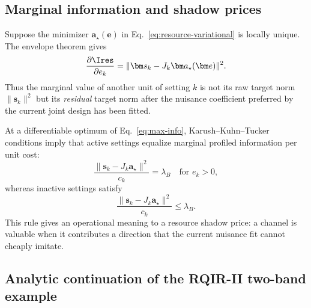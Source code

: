 \subsection{Marginal information and shadow prices}

Suppose the minimizer $\bm a_\star(\bm e)$ in Eq.~\eqref{eq:resource-variational} is locally unique. The envelope theorem gives
\begin{equation}
 \frac{\partial\Ires}{\partial e_k}
 =
 \|\bm s_k-J_k\bm a_\star(\bm e)\|^2.
\label{eq:marginal}
\end{equation}
Thus the marginal value of another unit of setting $k$ is not its raw target norm $\|\bm s_k\|^2$ but its \emph{residual} target norm after the nuisance coefficient preferred by the current joint design has been fitted.

At a differentiable optimum of Eq.~\eqref{eq:max-info}, Karush--Kuhn--Tucker conditions imply that active settings equalize marginal profiled information per unit cost:
\begin{equation}
 \frac{\|\bm s_k-J_k\bm a_\star\|^2}{c_k}
 =\lambda_B
 \quad\text{for } e_k>0,
\label{eq:kkt-active}
\end{equation}
whereas inactive settings satisfy
\begin{equation}
 \frac{\|\bm s_k-J_k\bm a_\star\|^2}{c_k}
 \le\lambda_B.
\label{eq:kkt-inactive}
\end{equation}
This rule gives an operational meaning to a resource shadow price: a channel is valuable when it contributes a direction that the current nuisance fit cannot cheaply imitate.

\subsection{Analytic continuation of the RQIR-II two-band example}

